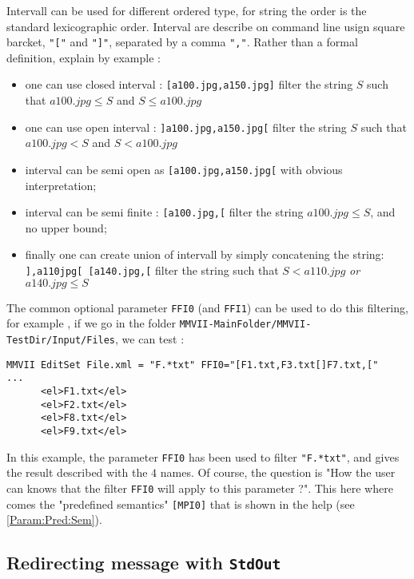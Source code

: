 \documentclass[a4paper]{book}
\newcommand{\MMVIDIR}{{\tt MMVII-MainFolder/}}
\begin{document}
{Intervall can be used for different  ordered type, for string the order
is the standard lexicographic order. Interval are describe on command
line usign square barcket, {\tt "["} and  {\tt "]"}, separated by a comma {\tt ","}.
Rather than a formal definition, explain by example :

\begin{itemize}
   \item one can use closed interval : {\tt [a100.jpg,a150.jpg]} filter the string $S$ such that   $ a100.jpg \leq S $ and  $ S \leq a100.jpg $ 
   \item one can use open interval  : {\tt ]a100.jpg,a150.jpg[} filter the string $S$ such that   $ a100.jpg <  S $ and  $ S < a100.jpg $ 
   \item interval can be semi open as  {\tt [a100.jpg,a150.jpg[} with obvious interpretation;
   \item interval can be semi finite :  {\tt [a100.jpg,[} filter the string  $ a100.jpg \leq S $, and no upper bound;
   \item finally one can create union of intervall by simply concatening the string: {\tt  ],a110jpg[ [a140.jpg,[}
         filter the string such that  $ S < a110.jpg $ \emph{or}  $  a140.jpg \leq S $
       
\end{itemize}

The common optional parameter {\tt FFI0} (and {\tt FFI1}) can be used to do this filtering,
for example , if we go in the folder  {\tt {\MMVIDIR}MMVII-TestDir/Input/Files}, we can test :

\begin{verbatim}
MMVII EditSet File.xml = "F.*txt" FFI0="[F1.txt,F3.txt[]F7.txt,["
...
      <el>F1.txt</el>
      <el>F2.txt</el>
      <el>F8.txt</el>
      <el>F9.txt</el>
\end{verbatim}

In this example, the parameter {\tt FFI0} has been used to filter {\tt "F.*txt"},
and gives the result described with the $4$ names. Of course, the question is "How the user can knows that the
filter  {\tt FFI0}  will apply to this parameter ?".  This here where comes the
"predefined semantics"  {\tt [MPI0]} that is shown in the help (see \ref{Param:Pred:Sem}).


\subsection{Redirecting message with {\tt StdOut}}

}
\end{document}
